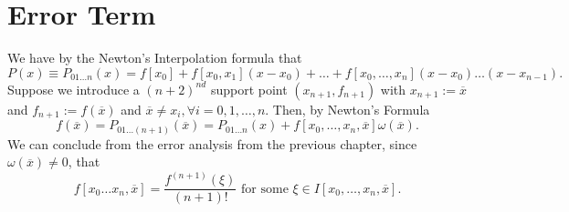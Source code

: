 \section{Error Term}

We have by the Newton's Interpolation formula that 
\[
    P(x) \equiv P_{01\ldots n}(x) = f[x_0] + f[x_0,x_1](x-x_0)+\ldots + f[x_0,\ldots, x_n](x-x_0)\ldots(x-x_{n-1})
.\] 
Suppose we introduce a $(n+2)^{nd}$ support point $(x_{n+1}, f_{n+1})$ with  $x_{n+1} := \overline{x}$ and $f_{n+1} := f(\overline{x})$ and $\overline{x} \neq x_i, \forall i = 0,1,\ldots, n$. Then, by Newton's Formula
\[
    f(\overline{x}) = P_{01\ldots(n+1)}(\overline{x}) = P_{01\ldots n}(x) + f[x_0,\ldots ,x_n,\overline{x}]\omega(\overline{x})
.\] 
We can conclude from the error analysis from the previous chapter, since $\omega (\overline{x}) \neq 0$, that 
\[
    f[x_0\ldots x_{n},\overline{x}] = \frac{f^{(n+1)}(\xi)}{ (n+1)!} \text{ for some } \xi \in I[x_0,\ldots,x_n,\overline{x}]
.\] 

